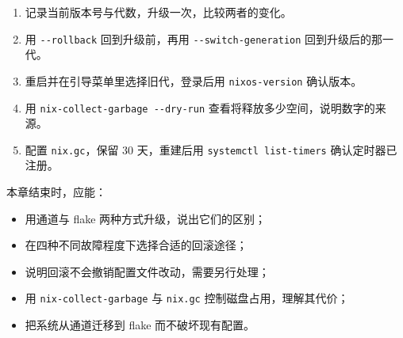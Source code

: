 \begin{enumerate}
  \item 记录当前版本号与代数，升级一次，比较两者的变化。
  \item 用 \texttt{-{}-rollback} 回到升级前，再用 \texttt{-{}-switch-\allowbreak{}generation} 回到升级后的那一代。
  \item 重启并在引导菜单里选择旧代，登录后用 \texttt{nixos-version} 确认版本。
  \item 用 \texttt{nix-collect-garbage -{}-dry-run} 查看将释放多少空间，说明数字的来源。
  \item 配置 \texttt{nix.gc}，保留 30 天，重建后用 \texttt{systemctl list-timers} 确认定时器已注册。
\end{enumerate}

\begin{checkpoint}
本章结束时，应能：
\begin{itemize}
  \item 用通道与 flake 两种方式升级，说出它们的区别；
  \item 在四种不同故障程度下选择合适的回滚途径；
  \item 说明回滚不会撤销配置文件改动，需要另行处理；
  \item 用 \texttt{nix-collect-garbage} 与 \texttt{nix.gc} 控制磁盘占用，理解其代价；
  \item 把系统从通道迁移到 flake 而不破坏现有配置。
\end{itemize}
\end{checkpoint}
